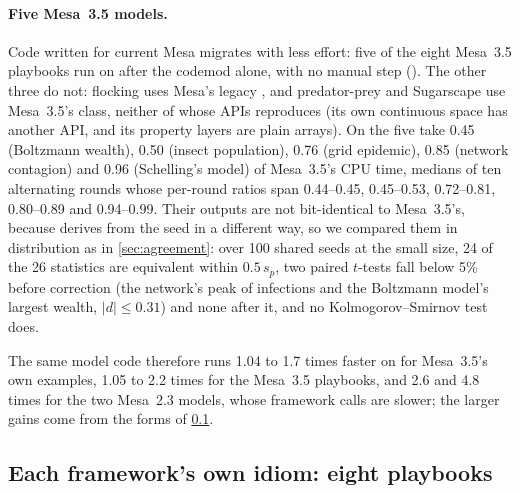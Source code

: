 \paragraph{Five Mesa~3.5 models.} Code written for current Mesa migrates with less effort:
five of the eight Mesa~3.5 playbooks run on \modelly{} after the codemod alone, with no manual
step (). The other three do not: flocking uses Mesa's legacy
, and predator-prey and Sugarscape use Mesa~3.5's
 class, neither of whose APIs \modelly{} reproduces (its own continuous
space has another API, and its property layers are plain  arrays). On \modelly{}
the five take 0.45 (Boltzmann wealth), 0.50 (insect population), 0.76 (grid epidemic), 0.85
(network contagion) and 0.96 (Schelling's model) of Mesa~3.5's CPU time, medians of ten
alternating rounds whose per-round ratios span 0.44--0.45, 0.45--0.53, 0.72--0.81, 0.80--0.89
and 0.94--0.99. Their outputs are not bit-identical to Mesa~3.5's, because \modelly{} derives
 from the seed in a different way, so we compared them in distribution as
in \cref{sec:agreement}: over 100 shared seeds at the small size, 24 of the 26 statistics are
equivalent within $0.5\,s_p$, two paired $t$-tests fall below 5\% before correction (the
network's peak of infections and the Boltzmann model's largest wealth, $|d| \le 0.31$) and
none after it, and no Kolmogorov--Smirnov test does.

The same model code therefore runs 1.04 to 1.7 times faster on \modelly{} for Mesa~3.5's own
examples, 1.05 to 2.2 times for the Mesa~3.5 playbooks, and 2.6 and 4.8 times for the two
Mesa~2.3 models, whose framework calls are slower; the larger gains come from the forms of
\cref{sec:playbooks}.

\subsection{Each framework's own idiom: eight playbooks}
\label{sec:playbooks}


